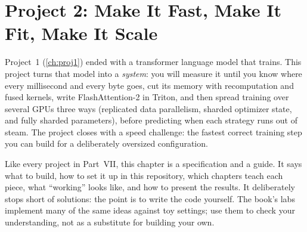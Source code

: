 \chapter{Project 2: Make It Fast, Make It Fit, Make It Scale}\label{ch:proj2}

Project~1 (\cref{ch:proj1}) ended with a transformer language model that trains. This project
turns that model into a \emph{system}: you will measure it until you know where every millisecond
and every byte goes, cut its memory with recomputation and fused kernels, write FlashAttention-2 in
Triton, and then spread training over several GPUs three ways (replicated data parallelism, sharded
optimizer state, and fully sharded parameters), before predicting when each strategy runs out of
steam. The project closes with a speed challenge: the fastest correct training step you can build
for a deliberately oversized configuration.

Like every project in Part~VII, this chapter is a specification and a guide. It says what to build,
how to set it up in this repository, which chapters teach each piece, what ``working'' looks like,
and how to present the results. It deliberately stops short of solutions: the point is to write the
code yourself. The book's labs implement many of the same ideas against toy settings; use them to
check your understanding, not as a substitute for building your own.

